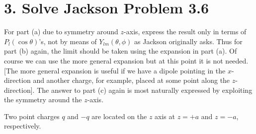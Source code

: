 \documentclass[a4paper,twoside]{article}
\begin{document}
\section*{3. Solve Jackson Problem 3.6}%
\label{sec:solve_jackson_problem_3_6}

For part (a) due to symmetry around $z$-axis, express the result only in terms of $P_l(\cos\theta)$’s, not by means of $Y_{lm}(\theta,\phi)$ as Jackson originally asks. Thus for part (b) again, the limit should be taken using the expansion in part (a). Of course we can use the more general expansion but at this point it is not needed. [The more general expansion is useful if we have a dipole pointing in the $x$-direction and another charge, for example, placed at some point along the $z$-direction]. The answer to part (c) again is most naturally expressed by exploiting the symmetry around the $z$-axis.

\hr

Two point charges $q$ and $-q$ are located on the $z$ axis at $z=+a$ and $z=-a$, respectively.
\end{document}
